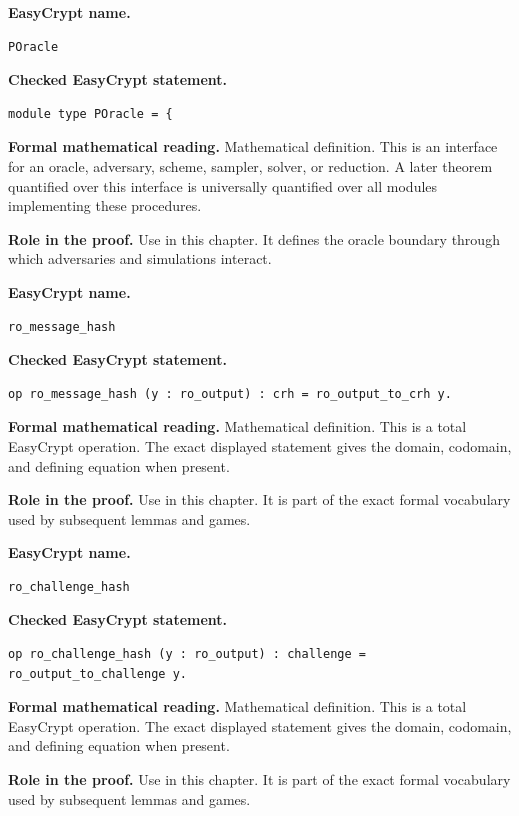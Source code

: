 \begin{formaldefinition}
\noindent\textbf{EasyCrypt name.}
\begin{lstlisting}[language=EasyCrypt,basicstyle=\ttfamily\scriptsize]
POracle
\end{lstlisting}
\noindent\textbf{Checked EasyCrypt statement.}
\begin{lstlisting}[language=EasyCrypt,basicstyle=\ttfamily\scriptsize]
module type POracle = {
\end{lstlisting}
\noindent\textbf{Formal mathematical reading.}
Mathematical definition. This is an interface for an oracle, adversary, scheme, sampler, solver, or reduction.  A later theorem quantified over this interface is universally quantified over all modules implementing these procedures.

\noindent\textbf{Role in the proof.}
Use in this chapter. It defines the oracle boundary through which adversaries and simulations interact.

\end{formaldefinition}

\begin{formaldefinition}
\noindent\textbf{EasyCrypt name.}
\begin{lstlisting}[language=EasyCrypt,basicstyle=\ttfamily\scriptsize]
ro_message_hash
\end{lstlisting}
\noindent\textbf{Checked EasyCrypt statement.}
\begin{lstlisting}[language=EasyCrypt,basicstyle=\ttfamily\scriptsize]
op ro_message_hash (y : ro_output) : crh = ro_output_to_crh y.
\end{lstlisting}
\noindent\textbf{Formal mathematical reading.}
Mathematical definition. This is a total EasyCrypt operation.  The exact displayed statement gives the domain, codomain, and defining equation when present.

\noindent\textbf{Role in the proof.}
Use in this chapter. It is part of the exact formal vocabulary used by subsequent lemmas and games.

\end{formaldefinition}

\begin{formaldefinition}
\noindent\textbf{EasyCrypt name.}
\begin{lstlisting}[language=EasyCrypt,basicstyle=\ttfamily\scriptsize]
ro_challenge_hash
\end{lstlisting}
\noindent\textbf{Checked EasyCrypt statement.}
\begin{lstlisting}[language=EasyCrypt,basicstyle=\ttfamily\scriptsize]
op ro_challenge_hash (y : ro_output) : challenge = ro_output_to_challenge y.
\end{lstlisting}
\noindent\textbf{Formal mathematical reading.}
Mathematical definition. This is a total EasyCrypt operation.  The exact displayed statement gives the domain, codomain, and defining equation when present.

\noindent\textbf{Role in the proof.}
Use in this chapter. It is part of the exact formal vocabulary used by subsequent lemmas and games.

\end{formaldefinition}

